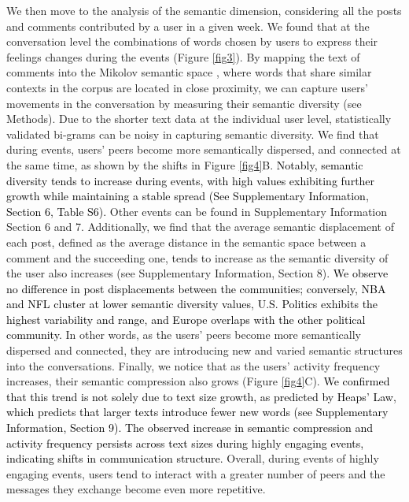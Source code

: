 \documentclass[fleqn,10pt]{wlscirep}
\newcommand{\new}[1]{\textcolor{black}{#1}}
\begin{document}
%
We then move to the analysis of the semantic dimension, considering all the posts and comments contributed by a user in a given week. 
We found that at the conversation level the combinations of words chosen by users to express their feelings changes during the events (Figure \ref{fig3}).
By mapping the text of comments into the Mikolov semantic space \cite{mikolov2013distributed}, where words that share similar contexts in the corpus are located in close proximity, we can capture users' movements in the conversation by measuring their semantic diversity (see Methods). 
Due to the shorter text data at the individual user level, statistically validated bi-grams can be noisy in capturing semantic diversity.
We find that during events, users' peers become more semantically dispersed, and connected at the same time, as shown by the shifts in Figure \ref{fig4}B. 
\new{
Notably, semantic diversity tends to increase during events, with high values exhibiting further growth while maintaining a stable spread (See Supplementary Information, Section 6, Table S6).
}
Other events can be found in Supplementary Information Section 6 and 7. 
Additionally, we find that the average semantic displacement of each post, defined as the average distance in the semantic space between a comment and the succeeding one, tends to increase as the semantic diversity of the user also increases (see Supplementary Information, Section 8).
\new{
We observe no difference in post displacements between the communities; conversely, NBA and NFL cluster at lower semantic diversity values, U.S. Politics exhibits the highest variability and range, and Europe overlaps with the other political community.
}
In other words, as the users' peers become more semantically dispersed and connected, they are introducing new and varied semantic structures into the conversations.
Finally, we notice that as the users' activity frequency increases, their semantic compression also grows (Figure \ref{fig4}C).
\new{
We confirmed that this trend is not solely due to text size growth, as predicted by Heaps' Law, which predicts that larger texts introduce fewer new words (see Supplementary Information, Section 9). 
The observed increase in semantic compression and activity frequency persists across text sizes during highly engaging events, indicating shifts in communication structure.
}
Overall, during events of highly engaging events, users tend to interact with a greater number of peers and the messages they exchange become even more repetitive. 
\end{document}
